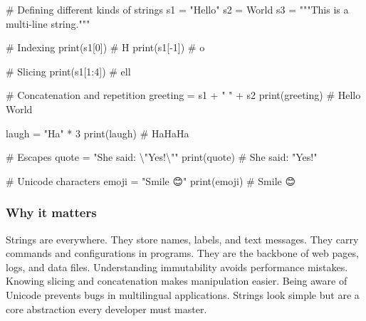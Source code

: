 \documentclass[
  letterpaper,
  DIV=11,
  numbers=noendperiod]{scrreprt}
\newenvironment{Shaded}{\begin{snugshade}}{\end{snugshade}}
\newcommand{\BuiltInTok}[1]{\textcolor[rgb]{0.00,0.23,0.31}{#1}}
\newcommand{\CharTok}[1]{\textcolor[rgb]{0.13,0.47,0.30}{#1}}
\newcommand{\CommentTok}[1]{\textcolor[rgb]{0.37,0.37,0.37}{#1}}
\newcommand{\DecValTok}[1]{\textcolor[rgb]{0.68,0.00,0.00}{#1}}
\newcommand{\NormalTok}[1]{\textcolor[rgb]{0.00,0.23,0.31}{#1}}
\newcommand{\OperatorTok}[1]{\textcolor[rgb]{0.37,0.37,0.37}{#1}}
\newcommand{\StringTok}[1]{\textcolor[rgb]{0.13,0.47,0.30}{#1}}
\begin{document}
\begin{Shaded}
\begin{Highlighting}[]
\CommentTok{\# Defining different kinds of strings}
\NormalTok{s1 }\OperatorTok{=} \StringTok{"Hello"}
\NormalTok{s2 }\OperatorTok{=} \StringTok{\textquotesingle{}World\textquotesingle{}}
\NormalTok{s3 }\OperatorTok{=} \StringTok{"""This is }
\StringTok{a multi{-}line string."""}

\CommentTok{\# Indexing}
\BuiltInTok{print}\NormalTok{(s1[}\DecValTok{0}\NormalTok{])      }\CommentTok{\# H}
\BuiltInTok{print}\NormalTok{(s1[}\OperatorTok{{-}}\DecValTok{1}\NormalTok{])     }\CommentTok{\# o}

\CommentTok{\# Slicing}
\BuiltInTok{print}\NormalTok{(s1[}\DecValTok{1}\NormalTok{:}\DecValTok{4}\NormalTok{])    }\CommentTok{\# ell}

\CommentTok{\# Concatenation and repetition}
\NormalTok{greeting }\OperatorTok{=}\NormalTok{ s1 }\OperatorTok{+} \StringTok{" "} \OperatorTok{+}\NormalTok{ s2}
\BuiltInTok{print}\NormalTok{(greeting)   }\CommentTok{\# Hello World}

\NormalTok{laugh }\OperatorTok{=} \StringTok{"Ha"} \OperatorTok{*} \DecValTok{3}
\BuiltInTok{print}\NormalTok{(laugh)      }\CommentTok{\# HaHaHa}

\CommentTok{\# Escapes}
\NormalTok{quote }\OperatorTok{=} \StringTok{"She said: }\CharTok{\textbackslash{}"}\StringTok{Yes!}\CharTok{\textbackslash{}"}\StringTok{"}
\BuiltInTok{print}\NormalTok{(quote)      }\CommentTok{\# She said: "Yes!"}

\CommentTok{\# Unicode characters}
\NormalTok{emoji }\OperatorTok{=} \StringTok{"Smile 😊"}
\BuiltInTok{print}\NormalTok{(emoji)      }\CommentTok{\# Smile 😊}
\end{Highlighting}
\end{Shaded}

\subsubsection{Why it matters}\label{why-it-matters-30}

Strings are everywhere. They store names, labels, and text messages.
They carry commands and configurations in programs. They are the
backbone of web pages, logs, and data files. Understanding immutability
avoids performance mistakes. Knowing slicing and concatenation makes
manipulation easier. Being aware of Unicode prevents bugs in
multilingual applications. Strings look simple but are a core
abstraction every developer must master.
\end{document}
